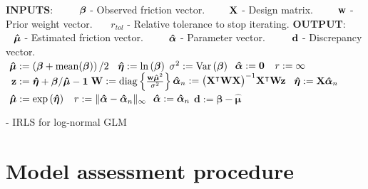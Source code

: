 \begin{algorithm}
  \normalsize
  \begin{algorithmic} 
    \State \textbf{INPUTS}: 
    \State \ \ \ $\phantom{r_{tol}}\mathllap{\bm{\beta}}$ - Observed friction vector.
    \State \ \ \ $\phantom{r_{tol}}\mathllap{\mat{X}}$ - Design matrix.
    \State \ \ \ $\phantom{r_{tol}}\mathllap{\mathbf{w}}$ - Prior weight vector.
    \State \ \ \ $r_{tol}$ - Relative tolerance to stop iterating.
    \State \textbf{OUTPUT}: 
    \State \ \ \ $\phantom{r_{tol}}\mathllap{\bm{\hat{\mu}}}$ - Estimated friction vector.
    \State \ \ \ $\phantom{r_{tol}}\mathllap{\bm{\hat{\alpha}}}$ - Parameter vector.
    \State \ \ \ $\phantom{r_{tol}}\mathllap{\mathbf{d}}$ - Discrepancy vector.
    \\
    \hrulefill
      \State $\phantom{\hat{\sigma}^2}\mathllap{\bm{\hat{\mu}}} := \left(\bm{\beta} + \mean(\bm{\beta}) \right) / 2$
      \State $\phantom{\hat{\sigma}^2}\mathllap{\bm{\hat{\eta}}} := \ln\left(\bm{\beta}\right)$
      \State $\sigma^2 := \mathrm{Var}\left(\bm{\beta}\right)$
      \State $\phantom{\hat{\sigma}^2}\mathllap{\bm{\hat{\alpha}}} := \mathbf{0}$
      \State $\phantom{\hat{\sigma}^2}\mathllap{r} := \infty$
        \State $\phantom{\hat{\sigma}^2}\mathllap{\mathbf{z}} := \bm{\hat{\eta}} + \bm{\beta} / \bm{\hat{\mu}} - \mathbf{1}$
        \State $\phantom{\hat{\sigma}^2}\mathllap{\mat{W}} := \diag\left\{\frac{\mathbf{w} \bm{\hat{\mu}}^2}{\sigma^2}\right\}$
        \State $\phantom{\hat{\sigma}^2}\mathllap{\bm{\hat{\alpha}}_n} := \big( \mat{X}\T \mat{W} \mat{X} \big)^{-1} \mat{X}\T \mat{W} \mathbf{z}$
        \State $\phantom{\hat{\sigma}^2}\mathllap{\bm{\hat{\eta}}} := \mat{X} \bm{\hat{\alpha}}_n$
        \State $\phantom{\hat{\sigma}^2}\mathllap{\bm{\hat{\mu}}} := \exp\left(\bm{\hat{\eta}}\right)$
        \State $\phantom{\hat{\sigma}^2}\mathllap{r} := \Vert \bm{\hat{\alpha}} - \bm{\hat{\alpha}}_n \Vert_{\infty}$
        \State $\phantom{\hat{\sigma}^2}\mathllap{\bm{\hat{\alpha}}} := \bm{\hat{\alpha}}_n$
      \EndWhile
      \State $\mathbf{d} := \bm{\beta} - \bm{\hat{\mu}}$
      \State {}
    \EndFunction
  \end{algorithmic}
  \caption[Iteratively-reweighted least-squares]{ - IRLS for log-normal GLM}
  \label{irls}
\end{algorithm}

\section{Model assessment procedure}

